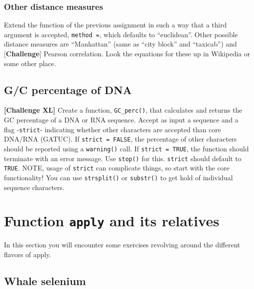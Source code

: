 \documentclass[]{book}
\begin{document}
\hypertarget{other-distance-measures}{%
\subsubsection*{Other distance measures}\label{other-distance-measures}}

Extend the function of the previous assignment in such a way that a third argument is accepted, \texttt{method\ =}, which defaults to ``euclidean''. Other possible distance measures are ``Manhattan'' (same as ``city block'' and ``taxicab'') and {[}\textbf{Challenge}{]} Pearson correlation. Look the equations for these up in Wikipedia or some other place.

\hypertarget{gc-percentage-of-dna}{%
\subsection{G/C percentage of DNA}\label{gc-percentage-of-dna}}

\textbf{{[}Challenge XL{]}} Create a function, \texttt{GC\_perc()}, that calculates and returns the GC percentage of a DNA or RNA sequence. Accept as input a sequence and a flag -\texttt{strict}- indicating whether other characters are accepted than core DNA/RNA (GATUC). If \texttt{strict\ =\ FALSE}, the percentage of other characters should be reported using a \texttt{warning()} call. If \texttt{strict\ =\ TRUE}, the function should terminate with an error message. Use \texttt{stop()} for this. \texttt{strict} should default to \texttt{TRUE}. NOTE, usage of \texttt{strict} can complicate things, so start with the core functionality!
You can use \texttt{strsplit()} or \texttt{substr()} to get hold of individual sequence characters.

\hypertarget{function-apply-and-its-relatives}{%
\section{\texorpdfstring{Function \texttt{apply} and its relatives}{Function apply and its relatives}}\label{function-apply-and-its-relatives}}

In this section you will encounter some exercises revolving around the different flavors of apply.

\hypertarget{whale-selenium}{%
\subsection{Whale selenium}\label{whale-selenium}}
\end{document}
